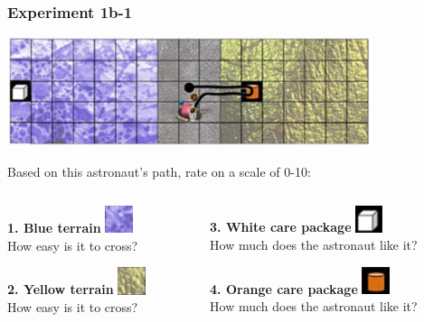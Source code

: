 \documentclass{beamer}
\begin{document}
\begin{frame}
\frametitle{Experiment 1b-1}
\begin{center}
\includegraphics[width=0.8\textwidth]{experiment_1b-1.png}
\end{center}
\vspace{0.3cm}
Based on this astronaut's path, rate on a scale of 0-10:
\begin{columns}
\begin{column}{0.5\textwidth}
\textbf{1. Blue terrain} \includegraphics[width=0.8cm]{blue_terrain.png}\\
How easy is it to cross?
\vspace{0.3cm}

\textbf{2. Yellow terrain} \includegraphics[width=0.8cm]{yellow_terrain.png}\\
How easy is it to cross?
\end{column}
\begin{column}{0.5\textwidth}
\textbf{3. White care package} \includegraphics[width=0.8cm]{white_carepackage.png}\\
How much does the astronaut like it?
\vspace{0.3cm}

\textbf{4. Orange care package} \includegraphics[width=0.8cm]{orange_carepackage.png}\\
How much does the astronaut like it?
\end{column}
\end{columns}
\end{frame}
\end{document}
